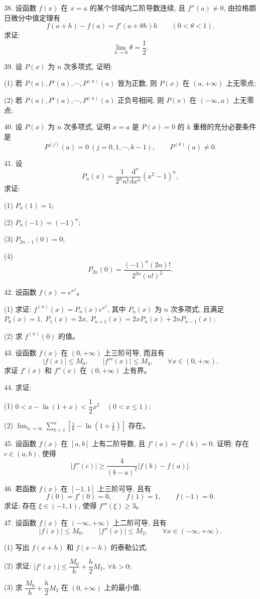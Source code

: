 \documentclass[UTF8, 12pt, fontset=fandol, oneside]{ctexart}
\begin{document}
38. 设函数 $f(x)$ 在 $x=a$ 的某个邻域内二阶导数连续, 且 $f''(a)\ne0$, 由拉格朗日微分中值定理有
\[
  f(a+h)-f(a)=f'(a+\theta h)h\qquad (0<\theta<1).
\]
求证:
\[
  \lim_{h\to0}\theta=\frac12.
\]

39. 设 $P(x)$ 为 $n$ 次多项式, 证明:

(1) 若 $P(a),P'(a),\cdots,P^{(n)}(a)$ 皆为正数, 则 $P(x)$ 在 $(a,+\infty)$ 上无零点;

(2) 若 $P(a),P'(a),\cdots,P^{(n)}(a)$ 正负号相间, 则 $P(x)$ 在 $(-\infty,a)$ 上无零点;

40. 设 $P(x)$ 为 $n$ 次多项式, 证明 $x=a$ 是 $P(x)=0$ 的 $k$ 重根的充分必要条件是
\[
  P^{(j)}(a)=0\ (j=0,1,\cdots,k-1),\qquad P^{(k)}(a)\ne0.
\]

41. 设
\[
  P_n(x)=\frac1{2^n n!}\frac{\mathrm d^n}{\mathrm dx^n}(x^2-1)^n,
\]
求证:

(1) $P_n(1)=1$;

(2) $P_n(-1)=(-1)^n$;

(3) $P_{2n-1}(0)=0$;

(4)
\[
  P_{2n}(0)=\frac{(-1)^n(2n)!}{2^{2n}(n!)^2}.
\]

42. 设函数 $f(x)=e^{x^2}$。

(1) 求证: $f^{(n)}(x)=P_n(x)e^{x^2}$, 其中 $P_n(x)$ 为 $n$ 次多项式, 且满足 $P_0(x)=1,\ P_1(x)=2x,\ P_{n+1}(x)=2xP_n(x)+2nP_{n-1}(x)$;

(2) 求 $f^{(n)}(0)$ 的值。

43. 设函数 $f(x)$ 在 $(0,+\infty)$ 上三阶可导, 而且有
\[
  |f(x)|\le M_0,\qquad |f'''(x)|\le M_3,\qquad \forall x\in(0,+\infty).
\]
求证 $f'(x)$ 和 $f''(x)$ 在 $(0,+\infty)$ 上有界。

44. 求证:

(1) $0<x-\ln(1+x)<\dfrac12x^2\quad (0<x\le1)$;

(2) $\displaystyle\lim_{n\to\infty}\sum_{k=1}^n\left[\frac1k-\ln\left(1+\frac1k\right)\right]$ 存在。

45. 设函数 $f(x)$ 在 $[a,b]$ 上有二阶导数, 且 $f'(a)=f'(b)=0$. 证明: 存在 $c\in(a,b)$, 使得
\[
  |f''(c)|\ge\frac4{(b-a)^2}|f(b)-f(a)|.
\]

46. 若函数 $f(x)$ 在 $[-1,1]$ 上三阶可导, 且有
\[
  f(0)=f'(0)=0,\qquad f(1)=1,\qquad f(-1)=0.
\]
求证: 存在 $\xi\in(-1,1)$, 使得 $f'''(\xi)\ge3$。

47. 设函数 $f(x)$ 在 $(-\infty,+\infty)$ 上二阶可导, 且有
\[
  |f(x)|\le M_0,\qquad |f''(x)|\le M_2,\qquad \forall x\in(-\infty,+\infty).
\]

(1) 写出 $f(x+h)$ 和 $f(x-h)$ 的泰勒公式;

(2) 求证: $|f'(x)|\le\dfrac{M_0}h+\dfrac h2M_2,\ \forall h>0$;

(3) 求 $\dfrac{M_0}h+\dfrac h2M_2$ 在 $(0,+\infty)$ 上的最小值;
\end{document}
